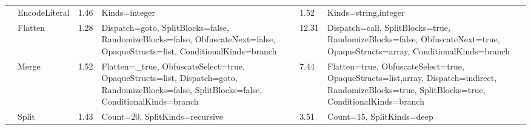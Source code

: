 \begin{table*}[!hp]
\begin{footnotesize}
\begin{tabular}{|p{1.5cm}|l|l|p{5cm}|l|p{5cm}|}
                                                                               & EncodeLiteral                                                         & 1.46                                                    &  Kinds=integer                                                                                                                                                                           & 1.52                                                    &  Kinds=string,integer                                                                                                                                                                        \\ \cline{2-6} 
                                                                               & Flatten                                                                & 1.28                                                    &  Dispatch=goto, SplitBlocks=false, RandomizeBlocks=false, ObfuscateNext=false, OpaqueStructs=list, ConditionalKinds=branch                                                               & 12.31                                                   &  Dispatch=call, SplitBlocks=true, RandomizeBlocks=false, ObfuscateNext=true, OpaqueStructs=array, ConditionalKinds=branch                                                                    \\ \cline{2-6} 
                                                                               & Merge                                                                  & 1.52                                                    &  Flatten=\_true, ObfuscateSelect=true, OpaqueStructs=list, Dispatch=goto, RandomizeBlocks=false, SplitBlocks=false, ConditionalKinds=branch                                              & 7.44                                                    &  Flatten=true, ObfuscateSelect=true, OpaqueStructs=list,array, Dispatch=indirect, RandomizeBlocks=true, SplitBlocks=true, ConditionalKinds=branch                                            \\ \cline{2-6} 
                                                                               & Split                                                                  & 1.43                                                    &  Count=20, SplitKinds=recursive                                                                                                                                                          & 3.51                                                    &  Count=15, SplitKinds=deep                                                                                                                                                                   \\ \cline{2-6} 

\end{tabular}
\end{footnotesize}
\end{table*}
